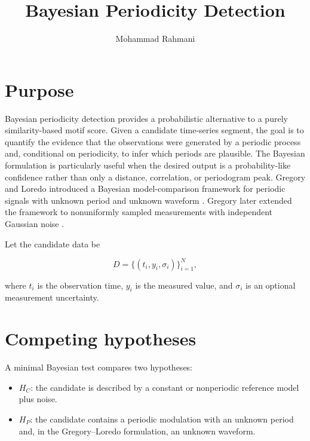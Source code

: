 \documentclass[a4paper]{article}
\title{Bayesian Periodicity Detection}
\date{}
\author{Mohammad Rahmani}
\begin{document}
\maketitle


\section{Purpose}

Bayesian periodicity detection provides a probabilistic alternative to a purely similarity-based motif score. Given a candidate time-series segment, the goal is to quantify the evidence that the observations were generated by a periodic process and, conditional on periodicity, to infer which periods are plausible. The Bayesian formulation is particularly useful when the desired output is a probability-like confidence rather than only a distance, correlation, or periodogram peak. Gregory and Loredo introduced a Bayesian model-comparison framework for periodic signals with unknown period and unknown waveform \citep{gregory-1992-a-new-method-for-the-detection-of-a-periodic-signal-of-unknown-shape-and-period}. Gregory later extended the framework to nonuniformly sampled measurements with independent Gaussian noise \citep{gregory-1999-bayesian-periodic-signal-detection-i-analysis-of-20-years-of-radio-flux-measurements-of-the-x-ray-binary-ls-i-plus-61-303}.

Let the candidate data be

\begin{equation}
D = \{(t_i,y_i,\sigma_i)\}_{i=1}^{N},
\end{equation}

where $t_i$ is the observation time, $y_i$ is the measured value, and $\sigma_i$ is an optional measurement uncertainty.

\section{Competing hypotheses}

A minimal Bayesian test compares two hypotheses:

\begin{itemize}

    \item $H_C$: the candidate is described by a constant or nonperiodic reference model plus noise.

    \item $H_P$: the candidate contains a periodic modulation with an unknown period and, in the Gregory--Loredo formulation, an unknown waveform.

\end{itemize}
\end{document}
